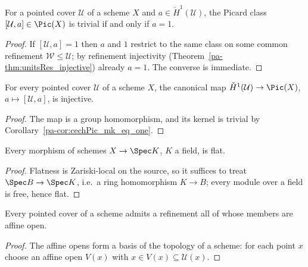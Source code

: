 \begin{corollary}
  \label{pa-cor:cechPic_mk_eq_one}
  \leanok

  For a pointed cover \(\mathcal U\) of a scheme \(X\) and \(a \in \check H^1(\mathcal U)\),
  the Picard class \([\mathcal U, a] \in \Pic(X)\) is trivial if and only if \(a = 1\).
\end{corollary}
\begin{proof}
  \leanok
  If \([\mathcal U, a] = 1\) then \(a\) and \(1\) restrict to the same class on some common
  refinement \(\mathcal W \le \mathcal U\); by refinement injectivity
  (Theorem~\ref{pa-thm:unitsRes_injective}) already \(a = 1\). The converse is immediate.
\end{proof}

\begin{corollary}
  \label{pa-cor:cechPic_mk_injective}
  \leanok

  For every pointed cover \(\mathcal U\) of a scheme \(X\), the canonical map
  \(\check H^1(\mathcal U) \to \Pic(X)\), \(a \mapsto [\mathcal U, a]\), is injective.
\end{corollary}
\begin{proof}
  \leanok
  The map is a group homomorphism, and its kernel is trivial by
  Corollary~\ref{pa-cor:cechPic_mk_eq_one}.
\end{proof}

\begin{lemma}
  \label{pa-lem:flat_of_field}
  \leanok

  Every morphism of schemes \(X \to \Spec K\), \(K\) a field, is flat.
\end{lemma}
\begin{proof}
  \leanok
  Flatness is Zariski-local on the source, so it suffices to treat
  \(\Spec B \to \Spec K\), i.e.\ a ring homomorphism \(K \to B\); every module over a field
  is free, hence flat.
\end{proof}

\begin{lemma}
  \label{pa-lem:pointedCover_affine_refinement}
  \leanok

  Every pointed cover of a scheme admits a refinement all of whose members are affine open.
\end{lemma}
\begin{proof}
  \leanok
  The affine opens form a basis of the topology of a scheme: for each point \(x\) choose an
  affine open \(V(x)\) with \(x \in V(x) \subseteq \mathcal U(x)\).
\end{proof}

